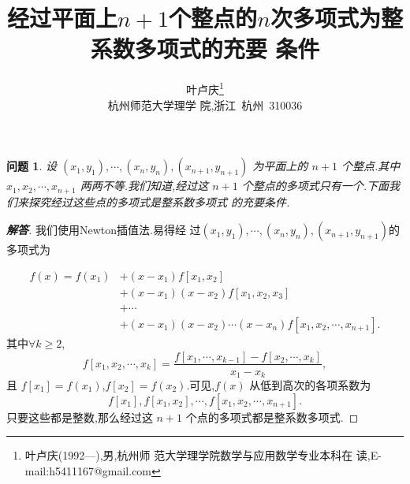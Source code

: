 \documentclass[twoside,11pt]{article}
\newtheorem{question}{问题}
\begin{document}
\title{\huge{\bf{经过平面上$n+1$个整点的$n$次多项式为整系数多项式的充要
      条件}}} \author{\small{叶卢庆\footnote{叶卢庆(1992---),男,杭州师
      范大学理学院数学与应用数学专业本科在
      读,E-mail:h5411167@gmail.com}}\\{\small{杭州师范大学理学
      院,浙江~杭州~310036}}} \date{}
\maketitle




\vspace{30pt} %

\begin{question}
  设 $(x_1,y_1),\cdots,(x_n,y_{n}),(x_{n+1},y_{n+1})$ 为平面上的 $n+1$
  个整点.其中 $x_1,x_2,\cdots,x_{n+1}$ 两两不等.我们知道,经过这 $n+1$
  个整点的多项式只有一个.下面我们来探究经过这些点的多项式是整系数多项式
  的充要条件.
\end{question}
\begin{proof}[\bf{解答}]
  我们使用Newton插值法.易得经
  过$(x_1,y_1),\cdots,(x_n,y_{n}),(x_{n+1},y_{n+1})$的多项式为

\begin{align*}
  f(x)=f(x_1)&+(x-x_1)f[x_1,x_2]\\&+(x-x_1)(x-x_2)f[x_1,x_2,x_3]\\&+\cdots\\&+(x-x_1)(x-x_2)\cdots
  (x-x_{n})f[x_1,x_2,\cdots,x_{n+1}].
\end{align*}
其中$\forall k\geq 2$,
$$f[x_1,x_2,\cdots,x_k]=\frac{f[x_1,\cdots,x_{k-1}]-f[x_2,\cdots,x_k]}{x_1-x_k},$$
且 $f[x_1]=f(x_1)$,$f[x_2]=f(x_2)$.可见,$f(x)$ 从低到高次的各项系数为
$$
f[x_1],f[x_1,x_2],\cdots,f[x_1,x_2,\cdots,x_{n+1}].
$$
只要这些都是整数,那么经过这 $n+1$ 个点的多项式都是整系数多项式.
\end{proof}
\end{document}
